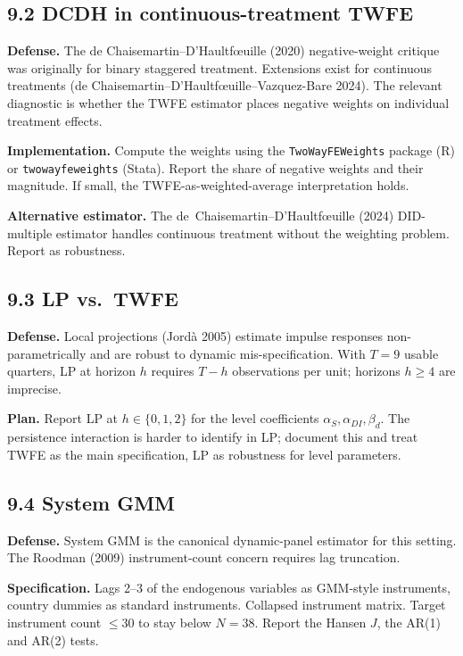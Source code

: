 \documentclass[11pt,a4paper]{article}
\begin{document}
\subsection*{9.2 DCDH in continuous-treatment TWFE}

\textbf{Defense.} The de Chaisemartin--D'Haultfœuille (2020) negative-weight critique was originally for binary staggered treatment. Extensions exist for continuous treatments (de Chaisemartin--D'Haultfœuille--Vazquez-Bare 2024). The relevant diagnostic is whether the TWFE estimator places negative weights on individual treatment effects.

\textbf{Implementation.} Compute the weights using the \texttt{TwoWayFEWeights} package (R) or \texttt{twowayfeweights} (Stata). Report the share of negative weights and their magnitude. If small, the TWFE-as-weighted-average interpretation holds.

\textbf{Alternative estimator.} The de~Chaisemartin--D'Haultfœuille (2024) DID-multiple estimator handles continuous treatment without the weighting problem. Report as robustness.

\subsection*{9.3 LP vs.\ TWFE}

\textbf{Defense.} Local projections (Jord\`a 2005) estimate impulse responses non-parametrically and are robust to dynamic mis-specification. With $T=9$ usable quarters, LP at horizon $h$ requires $T-h$ observations per unit; horizons $h \geq 4$ are imprecise.

\textbf{Plan.} Report LP at $h \in \{0, 1, 2\}$ for the level coefficients $\alpha_S, \alpha_{DI}, \beta_d$. The persistence interaction is harder to identify in LP; document this and treat TWFE as the main specification, LP as robustness for level parameters.

\subsection*{9.4 System GMM}

\textbf{Defense.} System GMM is the canonical dynamic-panel estimator for this setting. The Roodman (2009) instrument-count concern requires lag truncation.

\textbf{Specification.} Lags 2--3 of the endogenous variables as GMM-style instruments, country dummies as standard instruments. Collapsed instrument matrix. Target instrument count $\leq 30$ to stay below $N=38$. Report the Hansen $J$, the AR(1) and AR(2) tests.
\end{document}
